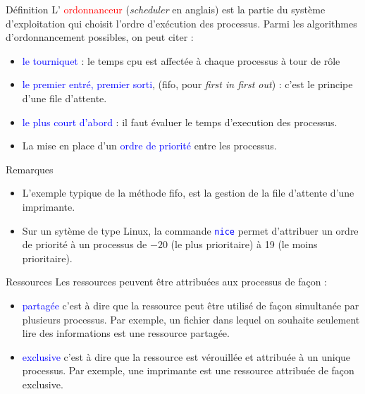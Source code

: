 \documentclass[10pt]{beamer}
\begin{document}
\begin{frame}
	\mframe{\Processus}
	\begin{alertblock}{Définition}
		L' \textcolor{red}{ordonnanceur} (\textit{scheduler} en anglais) est la partie du système d'exploitation qui choisit l'ordre d'exécution des processus. Parmi les algorithmes d'ordonnancement possibles, on peut citer :
		\begin{itemize}
			\item<2-> \textcolor{blue}{le tourniquet} : le temps {\sc cpu} est affectée à chaque processus à tour de rôle
			\item<3-> \textcolor{blue}{le premier entré, premier sorti}, ({\sc fifo}, pour \textit{first in first out}) : c'est le principe d'une file d'attente.
			\item<4-> \textcolor{blue}{le plus court d'abord} : il faut évaluer le temps d'execution des processus.
			\item<5-> La mise en place d'un \textcolor{blue}{ordre de priorité} entre les processus.
		\end{itemize}
	\end{alertblock}
	\begin{block}{Remarques}
		\begin{itemize}
			\item<6-> L'exemple typique de la méthode {\sc fifo}, est la gestion de la file d'attente d'une imprimante.
			\item<7-> Sur un sytème de type Linux, la commande \textcolor{blue}{\tt nice} permet d'attribuer un ordre de priorité à un processus de $-20$ (le plus prioritaire) à 19 (le moins prioritaire).
		\end{itemize}
	\end{block}
\end{frame}

\begin{frame}
	\mframe{\Processus}
	\begin{block}{Ressources}
		Les ressources peuvent être attribuées aux processus de façon :
		\begin{itemize}
			\item<2-> \textcolor{blue}{partagée} c'est à dire que la ressource peut être utilisé de façon simultanée par plusieurs processus.
			      \onslide<3-> Par exemple, un fichier dans lequel on souhaite seulement lire des informations est une ressource partagée.
			\item<4-> \textcolor{blue}{exclusive} c'est à dire que la ressource est vérouillée et attribuée à un unique processus.
			      \onslide<5-> Par exemple, une imprimante est une ressource attribuée de façon exclusive.
		\end{itemize}
	\end{block}
\end{frame}
\end{document}
